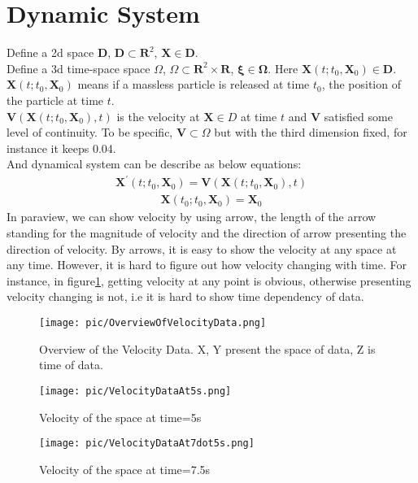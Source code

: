 \documentclass[
     11pt,         %
     a4paper,      %
     oneside,
     ]{article}
\newcommand{\vect}[1]{\boldsymbol{#1}}
\begin{document}
	\section{Dynamic System}
	Define a 2d space $\vect{D}$,  $\vect{D}\subset \vect{R}^{2}$, $\vect{X}\in \vect{D}$.\\
	Define a 3d time-space space $\Omega$, $\Omega \subset \vect{R}^{2}\times\vect{R}$, $\vect{\xi} \in \vect{\Omega}$.
	Here $\vect{X}(t;t_{0},\vect{X}_{0}) \in \vect{D}$. $\vect{X}(t;t_{0},\vect{X}_{0})$ means if a massless particle is released at time $t_{0}$, the position of the particle at time $t$. \\
	
	$\vect{V}(\vect{X}(t;t_{0},\vect{X}_{0}),t)$ is the velocity at $\vect{X} \in D$ at time $t$ and $\vect{V}$ satisfied some level of continuity. To be specific, $\vect{V}\subset \Omega$ but with the third dimension fixed, for instance it keeps 0.04.  \\
	And dynamical system can be describe as below equations:\\
	\begin{eqnarray}
	\vect{X}^{'}(t;t_{0},\vect{X}_{0})=\vect{V}(\vect{X}(t;t_{0},\vect{X}_{0}),t)
	\end{eqnarray}
	\begin{eqnarray}
	\vect{X}(t_{0};t_{0},\vect{X}_{0})=\vect{X}_{0}
	\end{eqnarray}
	In paraview, we can show velocity by using arrow, the length of the arrow standing for the magnitude of velocity and the direction of arrow presenting the direction of velocity. By arrows, it is easy to show the velocity at any space at any time. However, it is hard to figure out how velocity changing with time. For instance, in figure\ref{fig:Overviewofvelocitydata}, getting velocity at any point is obvious, otherwise presenting velocity changing is not, i.e it is hard to show time dependency of data. 
	\begin{figure}[H]
		\centering
		\texttt{[image: pic/OverviewOfVelocityData.png]}
		\caption{{\tiny Overview of the Velocity Data. X, Y present the space of data, Z is time of data.}}
		\label{fig:Overviewofvelocitydata}
	\end{figure}
	\begin{figure}[H]
		\begin{minipage}{0.5\textwidth}
			\centering
			\texttt{[image: pic/VelocityDataAt5s.png]}
			\caption{\tiny Velocity of the space at time=5s }
			\label{fig:VelocityDataAt5s}
		\end{minipage}
		\begin{minipage}{0.5\textwidth}
			\centering
			\texttt{[image: pic/VelocityDataAt7dot5s.png]}
			\caption{\tiny Velocity of the space at time=7.5s}
			\label{fig:VelocityDataAt7.5s}
		\end{minipage}
	\end{figure}
\end{document}
